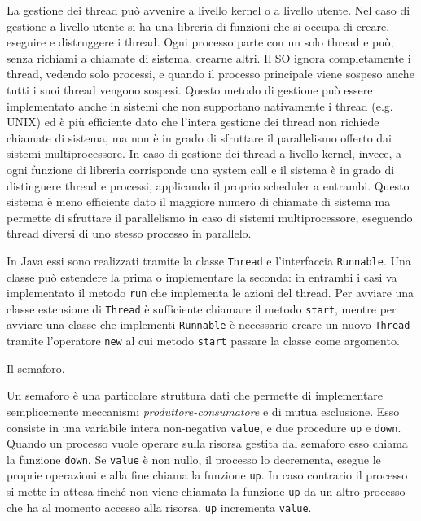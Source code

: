 \documentclass[answers,a4paper,12pt]{exam}
\begin{document}
\begin{questions}
\begin{solutionorlines}[3.8in]
	La gestione dei thread può avvenire a livello kernel o a livello utente. Nel caso di gestione a livello utente si ha una libreria di funzioni che si occupa di creare, eseguire e distruggere i thread. Ogni processo parte con un solo thread e può, senza richiami a chiamate di sistema, crearne altri. Il SO ignora completamente i thread, vedendo solo processi, e quando il processo principale viene sospeso anche tutti i suoi thread vengono sospesi. Questo metodo di gestione può essere implementato anche in sistemi che non supportano nativamente i thread (e.g. UNIX) ed è più efficiente dato che l'intera gestione dei thread non richiede chiamate di sistema, ma non è in grado di sfruttare il parallelismo offerto dai sistemi multiprocessore. In caso di gestione dei thread a livello kernel, invece, a ogni funzione di libreria corrisponde una system call e il sistema è in grado di distinguere thread e processi, applicando il proprio scheduler a entrambi. Questo sistema è meno efficiente dato il maggiore numero di chiamate di sistema ma permette di sfruttare il parallelismo in caso di sistemi multiprocessore, eseguendo thread diversi di uno stesso processo in parallelo.
	
	In Java essi sono realizzati tramite la classe \texttt{Thread} e l'interfaccia \texttt{Runnable}. Una classe può estendere la prima o implementare la seconda: in entrambi i casi va implementato il metodo \texttt{run} che implementa le azioni del thread. Per avviare una classe estensione di \texttt{Thread} è sufficiente chiamare il metodo \texttt{start}, mentre per avviare una classe che implementi \texttt{Runnable} è necessario creare un nuovo \texttt{Thread} tramite l'operatore \texttt{new} al cui metodo \texttt{start} passare la classe come argomento. \end{solutionorlines}
\question
Il semaforo.
\begin{solutionorlines}[3.8in]
Un semaforo è una particolare struttura dati che permette di implementare semplicemente meccanismi \textit{produttore-consumatore} e di mutua esclusione. Esso consiste in una variabile intera non-negativa \texttt{value}, e due procedure \texttt{up} e \texttt{down}. Quando un processo vuole operare sulla risorsa gestita dal semaforo esso chiama la funzione \texttt{down}. Se \texttt{value} è non nullo, il processo lo decrementa, esegue le proprie operazioni e alla fine chiama la funzione \texttt{up}. In caso contrario il processo si mette in attesa finché non viene chiamata la funzione \texttt{up} da un altro processo che ha al momento accesso alla risorsa. \texttt{up} incrementa \texttt{value}. 


\end{solutionorlines}
\end{questions}
\end{document}
